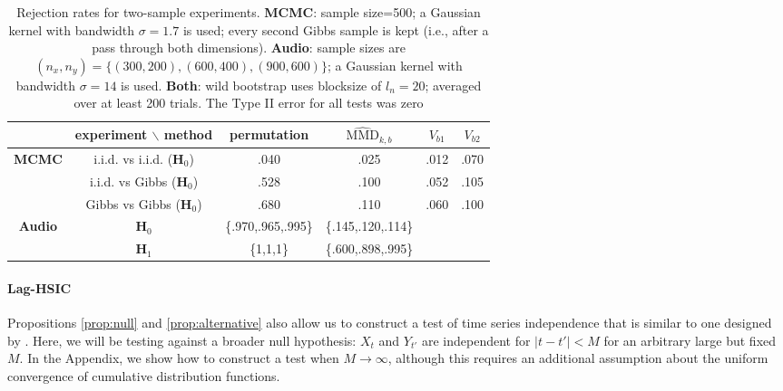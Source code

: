 \begin{table}\caption{Rejection rates for two-sample experiments. {\bf MCMC}: sample size=500; a Gaussian kernel with bandwidth
$\sigma=1.7$ is used; every second Gibbs sample is kept (i.e., after a pass
through both dimensions). {\bf Audio}: sample sizes are $(n_x,n_y)=\{(300,200),(600,400),(900,600)\}$; a Gaussian kernel with bandwidth
$\sigma=14$ is used. {\bf Both}: wild bootstrap
uses blocksize of $l_n=20$; averaged over at least 200 trials. The Type II error for all tests was zero}
\label{tab:gibbs_mmd}
\centering{}%
\begin{tabular}{|c|c|c|c|c|c|}
\cline{2-6} 
\multicolumn{1}{c|}{} & {\footnotesize experiment $\backslash$ method} & {\footnotesize permutation} & {\footnotesize $\widehat{\text{MMD}}_{k,b}$} & {\footnotesize $V_{b1}$} & {\footnotesize $V_{b2}$}\tabularnewline
\hline 
\textbf{\scriptsize MCMC} & {\footnotesize i.i.d. vs i.i.d. ($\mathbf{H}_{0}$)} & {\small .040} & {\small .025} & {\small .012}\textbf{\small{} } & {\small .070}\tabularnewline
\cline{2-6} 
 & {\footnotesize i.i.d. vs Gibbs ($\mathbf{H}_{0}$)} & {\small .528 } & {\small .100} & {\small .052} & {\small .105}\tabularnewline
\cline{2-6} 
 & {\footnotesize Gibbs vs Gibbs ($\mathbf{H}_{0}$)} & {\small .680 } & {\small .110} & {\small .060} & {\small .100}\tabularnewline
\hline 
\textbf{\scriptsize Audio} & {\footnotesize $\mathbf{H}_{0}$} & {\small \{.970,.965,.995\}} & {\small \{.145,.120,.114\}} & \multicolumn{1}{c}{} & \multicolumn{1}{c}{}\tabularnewline
\cline{2-4} 
 & {\footnotesize $\mathbf{H}_{1}$} & {\small \{1,1,1\}} & {\small \{.600,.898,.995\}} & \multicolumn{1}{c}{} & \multicolumn{1}{c}{}\tabularnewline
\cline{1-4} 
\end{tabular}
\end{table}



\paragraph{Lag-HSIC}
Propositions \ref{prop:null} and \ref{prop:alternative} also allow us to construct a test of time series independence that is similar to one designed by  \cite{besserve_statistical_2013}. Here, we will be testing against a broader null hypothesis:  $X_t$ and $Y_{t'}$ are independent for $|t-t'|<M$ for an arbitrary large but fixed $M$. In the Appendix, we show how to construct a test when $M\to\infty$, although this requires an additional assumption about the uniform convergence of cumulative distribution functions.


